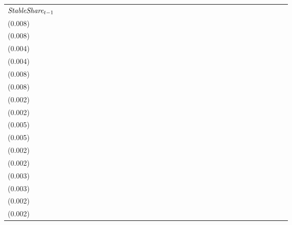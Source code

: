 \begin{tabular}{lllllllllllllllllllllllllllllllll}
${{\it StableShare}}_{t-1}$  &                                     &                                     &   \makecell{$0.628^{**}$ \\(0.008)} &   \makecell{$0.627^{**}$ \\(0.008)} &                                     &                                     &   \makecell{$0.107^{**}$ \\(0.004)} &   \makecell{$0.107^{**}$ \\(0.004)} &                                     &                                     &  \makecell{$-0.202^{**}$ \\(0.008)} &  \makecell{$-0.201^{**}$ \\(0.008)} &                                     &                                     &  \makecell{$-0.006^{**}$ \\(0.002)} &  \makecell{$-0.006^{**}$ \\(0.002)} &                                     &                                     &  \makecell{$-0.189^{**}$ \\(0.005)} &  \makecell{$-0.188^{**}$ \\(0.005)} &                                     &                                     &  \makecell{$-0.007^{**}$ \\(0.002)} &  \makecell{$-0.007^{**}$ \\(0.002)} &                                     &                                     &   \makecell{$0.258^{**}$ \\(0.003)} &  \makecell{$0.258^{**}$ \\(0.003)} &                                    &                                    &  \makecell{$0.027^{**}$ \\(0.002)} &  \makecell{$0.027^{**}$ \\(0.002)} \\

\end{tabular}
